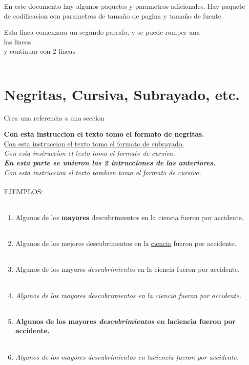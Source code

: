 \documentclass[12pt, letterpaper]{article} %
\begin{document}
          En este documento hay algunos paquetes y parametros adicionales. Hay paquete de codificacion con parametros de tamaño de pagina y tamaño de fuente.
		
          Esta linea comenzara un segundo parrafo, y se puede romper una \\ las lineas \\ y continuar con 2 lineas\\\\
		
	\section{Negritas, Cursiva, Subrayado, etc.}\label{sec:Negritas, Cursiva, Subrayado, etc.} Crea una referencia a una seccion
		
          \textbf{Con esta instruccion el texto tomo el formato de negritas.}\\
          \underline{Con esta instruccion el texto tomo el formato de subrayado.}\\
          \textit{Con esta instruccion el texto toma el formato de cursiva.}\\
          \textbf{\textit{En esta parte se unieron las 2 intrucciones de las anteriores.}}\\
          \emph{Con esta instruccion el texto tambien toma el formato de cursiva.}\\\\

          EJEMPLOS:\\\\
          
	\begin{enumerate} %
	
          \item Algunos de los \textbf{mayores} descubrimientos en la ciencia fueron por accidente.\\\\
          \item Algunos de los mejores descubrimentos en la \underline{ciencia} fueron por accidente.\\\\
          \item Algunos de los mayores \emph{descubrimientos} en la ciencia fueron por accidente.\\\\
          \item \textit{Algunos de los mayores \emph{descubrimientos} en la ciencia fueron por accidente.}\\\\
          \item \textbf{Algunos de los mayores \emph{descubrimientos} en laciencia fueron por accidente.}\\\\          
          \item \textit{Algunos de los mayores \emph{descubrimientos} en laciencia fueron por accidente.}\\\\
          
	\end{enumerate}
	
\end{document}
